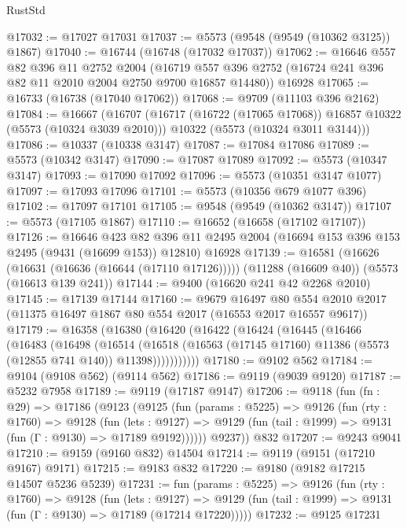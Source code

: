 \begin{lexlean}{RustStd}
\begin{coremodule}
@17032 := @17027 @17031
@17037 := @5573 (@9548 (@9549 (@10362 @3125)) @1867)
@17040 := @16744 (@16748 (@17032 @17037))
@17062 := @16646
    @557
    @82
    @396
    @11
    @2752
    @2004
    (@16719 @557 @396 @2752 (@16724 @241 @396 @82 @11 @2010 @2004 @2750 @9700 @16857 @14480))
    @16928
@17065 := @16733 (@16738 (@17040 @17062))
@17068 := @9709 (@11103 @396 @2162)
@17084 := @16667
    (@16707
      (@16717 (@16722 (@17065 @17068)) @16857 @10322 (@5573 (@10324 @3039 @2010)))
      @10322
      (@5573 (@10324 @3011 @3144)))
@17086 := @10337 (@10338 @3147)
@17087 := @17084 @17086
@17089 := @5573 (@10342 @3147)
@17090 := @17087 @17089
@17092 := @5573 (@10347 @3147)
@17093 := @17090 @17092
@17096 := @5573 (@10351 @3147 @1077)
@17097 := @17093 @17096
@17101 := @5573 (@10356 @679 @1077 @396)
@17102 := @17097 @17101
@17105 := @9548 (@9549 (@10362 @3147))
@17107 := @5573 (@17105 @1867)
@17110 := @16652 (@16658 (@17102 @17107))
@17126 := @16646
    @423
    @82
    @396
    @11
    @2495
    @2004
    (@16694 @153 @396 @153 @2495 (@9431 (@16699 @153)) @12810)
    @16928
@17139 := @16581
    (@16626 (@16631 (@16636 (@16644 (@17110 @17126)))))
    (@11288 (@16609 @40))
    (@5573 (@16613 @139 @241))
@17144 := @9400 (@16620 @241 @42 @2268 @2010)
@17145 := @17139 @17144
@17160 := @9679
    @16497
    @80
    @554
    @2010
    @2017
    (@11375 @16497 @1867 @80 @554 @2017 (@16553 @2017 @16557 @9617))
@17179 := @16358
    (@16380
      (@16420
        (@16422
          (@16424
            (@16445
              (@16466
                (@16483
                  (@16498
                    (@16514
                      (@16518
                        (@16563 (@17145 @17160) @11386 (@5573 (@12855 @741 @140)) @11398)))))))))))
@17180 := @9102 @562
@17184 := @9104 (@9108 @562) (@9114 @562)
@17186 := @9119 (@9039 @9120)
@17187 := @5232 @7958
@17189 := @9119 (@17187 @9147)
@17206 := @9118
    (fun (fn : @29) =>
    @17186
      (@9123
        (@9125
          (fun (params : @5225) =>
          @9126
            (fun (rty : @1760) =>
            @9128
              (fun (lets : @9127) =>
              @9129 (fun (tail : @1999) => @9131 (fun (Γ : @9130) => @17189 @9192))))))
        @9237))
    @832
@17207 := @9243 @9041
@17210 := @9159 (@9160 @832) @14504
@17214 := @9119 (@9151 (@17210 @9167) @9171)
@17215 := @9183 @832
@17220 := @9180 (@9182 @17215 @14507 @5236 @5239)
@17231 := fun (params : @5225) =>
  @9126
    (fun (rty : @1760) =>
    @9128
      (fun (lets : @9127) =>
      @9129 (fun (tail : @1999) => @9131 (fun (Γ : @9130) => @17189 (@17214 @17220)))))
@17232 := @9125 @17231

\end{coremodule}
\end{lexlean}
